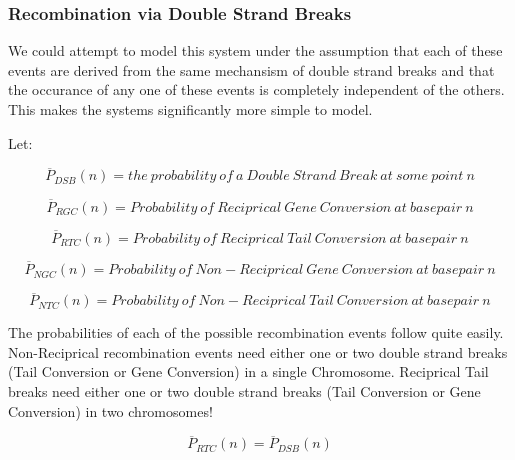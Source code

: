 \documentclass{article}
\begin{document}
    \subsubsection{Recombination via Double Strand Breaks}\label{recombination_theory_2}
        We could attempt to model this system under the assumption that each of these events are derived from the same mechansism of double strand breaks and that the occurance of any one of these events is completely independent of the others.  This makes the systems significantly more simple to model. \bigbreak

        Let:

        \begin{equation}
            \overline{P}_{DSB}(n) = the\ probability\ of\ a\ Double\ Strand\ Break\ at\ some\ point\ n
        \end{equation}

        \begin{equation}
            \overline{P}_{RGC}(n) = Probability\ of\ Reciprical\ Gene\ Conversion\ at\ basepair\ n
        \end{equation}

        \begin{equation}
            \overline{P}_{RTC}(n) = Probability\ of\ Reciprical\ Tail\ Conversion\ at\ basepair\ n
        \end{equation}

        \begin{equation}
            \overline{P}_{NGC}(n) = Probability\ of\ Non-Reciprical\ Gene\ Conversion\ at\ basepair\ n
        \end{equation}

        \begin{equation}
            \overline{P}_{NTC}(n) = Probability\ of\ Non-Reciprical\ Tail\ Conversion\ at\ basepair\ n
        \end{equation}



        The probabilities of each of the possible recombination events follow quite easily.   Non-Reciprical recombination events need either one or two double strand breaks (Tail Conversion or Gene Conversion) in a single Chromosome.  Reciprical Tail breaks need either one or two double strand breaks (Tail Conversion or Gene Conversion) in two chromosomes!

        \begin{equation}
            \overline{P}_{RTC}(n) = \overline{P}_{DSB}(n)
        \end{equation}
\end{document}
